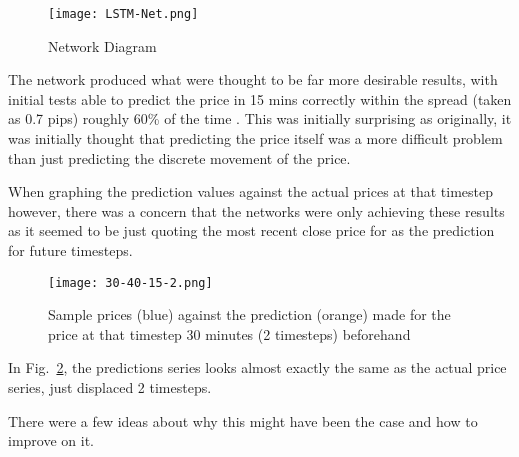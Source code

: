             \begin{figure}[h]
                \centering
                \texttt{[image: LSTM-Net.png]}
                \caption{Network Diagram}
                \label{fig:LSTM_Diagram}
            \end{figure}

            The network produced what were thought to be far more desirable results, with initial tests able to predict the price in 15 mins correctly within the spread (taken as 0.7 pips) roughly 60\% of the time . This was initially surprising as originally, it was initially thought that predicting the price itself was a more difficult problem than just predicting the discrete movement of the price.

            When graphing the prediction values against the actual prices at that timestep however, there was a concern that the networks were only achieving these results as it seemed to be just quoting the most recent close price for as the prediction for future timesteps.

            \begin{figure}[h]
                \centering
                \texttt{[image: 30-40-15-2.png]}
                \caption{Sample prices (blue) against the prediction (orange) made for the price at that timestep 30 minutes (2 timesteps) beforehand}
                \label{fig:30_predictions}
            \end{figure}

            In Fig.~\ref{fig:30_predictions}, the predictions series looks almost exactly the same as the actual price series, just displaced 2 timesteps. 

            There were a few ideas about why this might have been the case and how to improve on it.

